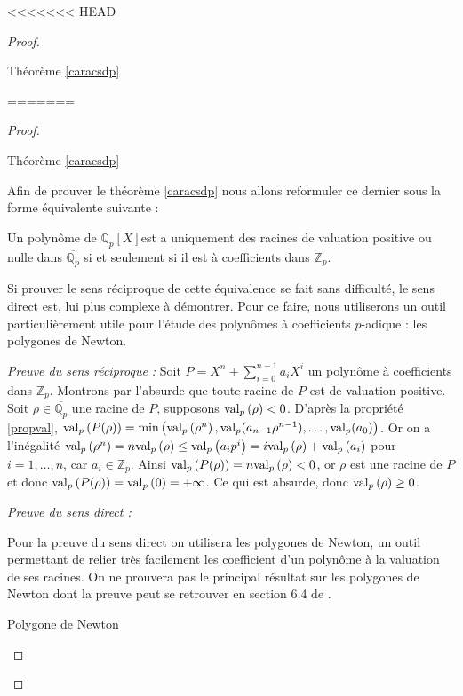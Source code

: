 <<<<<<< HEAD
\begin{proof} \hypertarget{caracsdppreuve}{Théorème \ref{caracsdp} }

=======
\begin{proof} \hypertarget{caractères}{Théorème \ref{caracsdp} }
	
Afin de prouver le théorème \ref{caracsdp} nous allons reformuler ce dernier sous la forme équivalente suivante : 

	\begin{propriete}
		Un polynôme de $\mathbb{Q}_{p} [X] $est a uniquement des racines de valuation positive ou nulle dans $\overline{\mathbb{Q}_{p} }$ si et seulement si il est à coefficients dans $\mathbb{Z}_p$. 
	\end{propriete}
Si prouver le sens réciproque de cette équivalence se fait sans difficulté, le sens direct est, lui plus complexe à démontrer. Pour ce faire, nous utiliserons un outil particulièrement utile pour l'étude des polynômes à coefficients $p$-adique : les polygones de Newton.

\textit{Preuve du sens réciproque :} 
	Soit $P = X^n + \sum \limits_{i=0}^{n-1} a_{i} X^i $ un polynôme à coefficients dans $\mathbb{Z}_{p}$. 
	Montrons par l'absurde que toute racine de $P$ est de valuation positive. Soit $\rho \in \overline{\mathbb{Q}_{p} }$ une racine de $P$, supposons $\text{val}_p\left( \rho\right)<0$. D'après la propriété \ref{propval}, $\text{val}_p\left(P( \rho)\right) = \min \left( \text{val}_p\left( \rho^n \right), \text{val}_p(a_{n-1} \rho^{n-1}),\ldots, \text{val}_p(a_0) \right)$. Or on a l'inégalité $\text{val}_p\left( \rho^n\right) = n \text{val}_p\left( \rho\right)\le \text{val}_p\left(a_{i} p^{i} \right) = i\text{val}_p\left( \rho \right) + \text{val}_p\left(a_{i}\right)$ pour $i=1,\ldots,n$, car $a_i \in \mathbb{Z}_p$. Ainsi $\text{val}_p\left(P( \rho)\right) = n \text{val}_p\left( \rho\right) <0$, or $\rho$ est une racine de $P$ et donc $\text{val}_p\left( P( \rho) \right) = \text{val}_p\left(0\right) = +\infty$. Ce qui est absurde, donc $\text{val}_p\left( \rho\right) \ge 0$.

	\textit{Preuve du sens direct :} 

	Pour la preuve du sens direct on utilisera les polygones de Newton, un outil permettant de relier très facilement les coefficient d'un polynôme à la valuation de ses racines. On ne prouvera pas le principal résultat sur les polygones de Newton dont la preuve peut se retrouver en section 6.4 de \cite{gouvea_p-adic_2003} . 

\begin{definition}
	Polygone de Newton


\end{definition}
\end{proof}
\end{proof}
